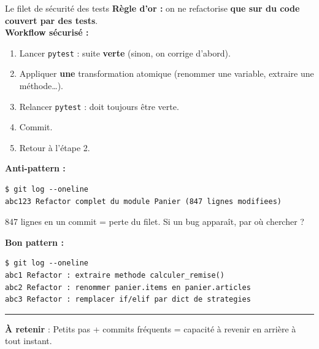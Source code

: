 \documentclass[aspectratio=169,11pt]{beamer}
\newcommand{\takeaway}[1]{%
\vfill\begin{beamercolorbox}[wd=\linewidth,sep=0.4em]{}
\color{accent2}\rule[0.6ex]{1.2em}{1.2pt}\hspace{0.4em}%
\textbf{\color{accent2}\small À retenir} \textcolor{textsoft}{:} %
{\small\color{textmain}#1}
\end{beamercolorbox}}
\begin{document}
\begin{frame}[fragile,t,shrink=12]{Le filet de s\'ecurit\'e des tests}
\footnotesize
\textbf{R\`egle d'or :} on ne refactorise \textbf{que sur du code couvert par des tests}. \\[0.4em]

\textbf{Workflow s\'ecuris\'e :}
\begin{enumerate}\itemsep0.1em
\item Lancer \texttt{pytest} : suite \textbf{verte} (sinon, on corrige d'abord).
\item Appliquer \textbf{une} transformation atomique (renommer une variable, extraire une méthode\ldots).
\item Relancer \texttt{pytest} : doit toujours être verte.
\item Commit.
\item Retour à l'étape 2.
\end{enumerate}

\vspace{0.4cm}
\textbf{Anti-pattern :}
\begin{lstlisting}[style=bashdark]
$ git log --oneline
abc123 Refactor complet du module Panier (847 lignes modifiees)
\end{lstlisting}
\vspace{0.1em}
{\color{textsoft}847 lignes en un commit = perte du filet. Si un bug apparaît, par où chercher ?}

\vspace{0.3em}
\textbf{Bon pattern :}
\begin{lstlisting}[style=bashdark]
$ git log --oneline
abc1 Refactor : extraire methode calculer_remise()
abc2 Refactor : renommer panier.items en panier.articles
abc3 Refactor : remplacer if/elif par dict de strategies
\end{lstlisting}
\takeaway{Petits pas + commits fréquents = capacité à revenir en arrière à tout instant.}
\end{frame}
\end{document}
